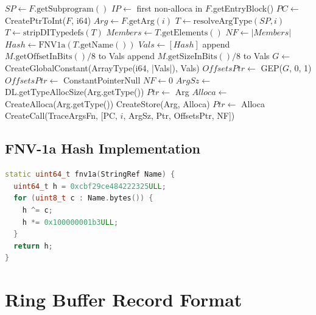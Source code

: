 \documentclass{ndss}
\begin{document}
\begin{algorithmic}[1]
  \State $\mathit{SP} \gets F.\mathrm{getSubprogram()}$
   \Return \EndIf
   \Return \EndIf
  \State $\mathit{IP} \gets$ first non-alloca in $F$.getEntryBlock()
  \State $\mathit{PC} \gets$ CreatePtrToInt($F$, i64)
    \State $\mathit{Arg} \gets F.\mathrm{getArg}(i)$
    \State $T \gets \mathrm{resolveArgType}(\mathit{SP}, i)$
    \State $T \gets \mathrm{stripDITypedefs}(T)$
      \State $\mathit{Members} \gets T.\mathrm{getElements()}$
      \State $\mathit{NF} \gets |\mathit{Members}|$
      \State $\mathit{Hash} \gets \mathrm{FNV1a}(T.\mathrm{getName()})$
      \State $\mathit{Vals} \gets [\mathit{Hash}]$
        \State append $M.\mathrm{getOffsetInBits()}/8$ to Vals
        \State append $M.\mathrm{getSizeInBits()}/8$ to Vals
      \EndFor
      \State $G \gets$ CreateGlobalConstant(ArrayType(i64, |Vals|), Vals)
      \State $\mathit{OffsetsPtr} \gets$ GEP($G$, 0, 1)
    \Else
      \State $\mathit{OffsetsPtr} \gets$ ConstantPointerNull
      \State $\mathit{NF} \gets 0$
    \EndIf
    \State $\mathit{ArgSz} \gets$ DL.getTypeAllocSize(Arg.getType())
      \State $\mathit{Ptr} \gets$ Arg
    \Else
      \State $\mathit{Alloca} \gets$ CreateAlloca(Arg.getType())
      \State CreateStore(Arg, Alloca)
      \State $\mathit{Ptr} \gets$ Alloca
    \EndIf
    \State CreateCall(TraceArgsFn, [PC, $i$, ArgSz, Ptr, OffsetsPtr, NF])
  \EndFor
\EndFunction
\end{algorithmic}

\subsection{FNV-1a Hash Implementation}

\begin{lstlisting}[language=C++,numbers=none]
static uint64_t fnv1a(StringRef Name) {
  uint64_t h = 0xcbf29ce484222325ULL;
  for (uint8_t c : Name.bytes()) {
    h ^= c;
    h *= 0x100000001b3ULL;
  }
  return h;
}
\end{lstlisting}

\section{Ring Buffer Record Format}\label{app:ringbuf}
\end{document}
